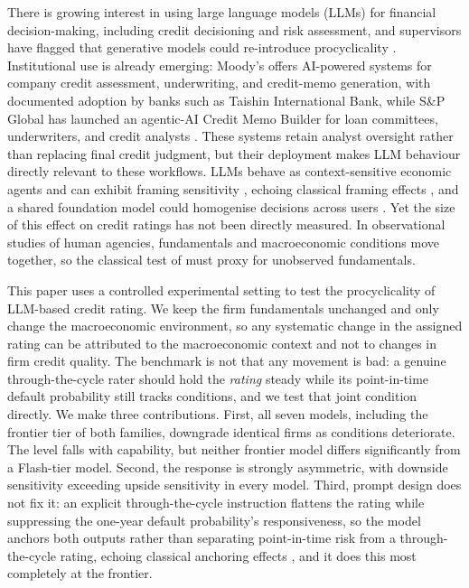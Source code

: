 \documentclass[a4paper,fleqn]{cas-sc}
\begin{document}
There is growing interest in using large language models (LLMs) for financial decision-making,
including credit decisioning and risk assessment, and supervisors have flagged that generative models
could re-introduce procyclicality \citep{bis2024}. Institutional use is already emerging: Moody's offers AI-powered
systems for company credit assessment, underwriting, and credit-memo generation, with documented
adoption by banks such as Taishin International Bank, while S\&P Global has launched an agentic-AI
Credit Memo Builder for loan committees, underwriters, and credit analysts
\citep{moodys2026a,moodys2026b,spglobal2026}. These systems retain analyst oversight rather than
replacing final credit judgment, but their deployment makes LLM behaviour directly relevant to
these workflows. LLMs behave as
context-sensitive economic agents \citep{horton2023} and can exhibit framing sensitivity
\citep{binz2023}, echoing classical framing effects \citep{tversky1981}, and a shared foundation
model could homogenise decisions across users \citep{bommasani2022}. Yet the size of this effect on credit ratings has not
been directly measured. In observational studies of human agencies, fundamentals and macroeconomic
conditions move together, so the classical test of \citet{amato2004} must proxy for unobserved
fundamentals.

This paper uses a controlled experimental setting to test the procyclicality of LLM-based credit
rating. We keep the firm fundamentals unchanged and only change the macroeconomic environment, so any
systematic change in the assigned rating can be attributed to the macroeconomic context and not to
changes in firm credit quality. The benchmark is not that any movement is bad: a genuine
through-the-cycle rater should hold the \emph{rating} steady while its point-in-time default
probability still tracks conditions, and we test that joint condition directly. We make three
contributions. First, all seven models, including the frontier tier of both families, downgrade
identical firms as conditions deteriorate. The level falls with capability, but neither frontier model
differs significantly from a Flash-tier model. Second, the response is strongly
asymmetric, with downside sensitivity exceeding upside sensitivity in every model. Third, prompt design
does not fix it: an explicit through-the-cycle instruction flattens the rating while suppressing the
one-year default probability's responsiveness, so the model anchors both outputs rather than separating
point-in-time risk from a through-the-cycle rating, echoing classical anchoring effects
\citep{tversky1974}, and it does this most completely at the frontier. 
\end{document}
